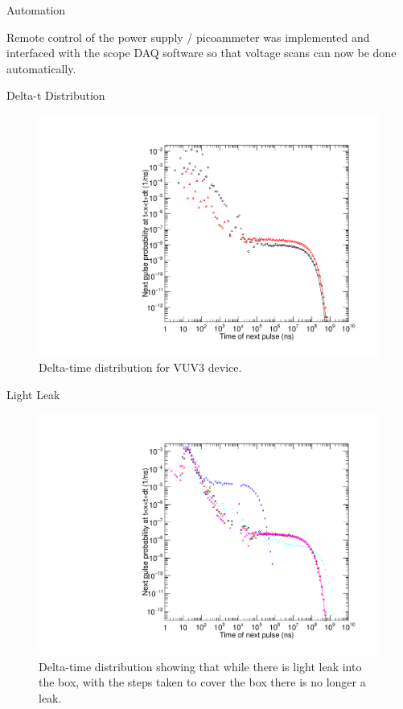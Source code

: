 \documentclass{beamer}
\begin{document}
\begin{frame}{Automation}
\begin{itemize}
Remote control of the power supply / picoammeter was implemented and interfaced with the scope DAQ software so that voltage scans can now be done automatically. 
\end{itemize}
\end{frame}

\begin{frame}{Delta-t Distribution}
\begin{figure}
\centering
\includegraphics[height=0.5\textwidth]{DTVUV3.pdf}
\caption{Delta-time distribution for VUV3 device.}
\end{figure}
\end{frame}

\begin{frame}{Light Leak}
\begin{figure}
\centering
\includegraphics[height=0.5\textwidth]{DTimeLightLeakAug5.pdf}
\caption{Delta-time distribution showing that while there is light leak into the box, with the steps taken to cover the box there is no longer a leak.}
\end{figure}
\end{frame}
\end{document}

